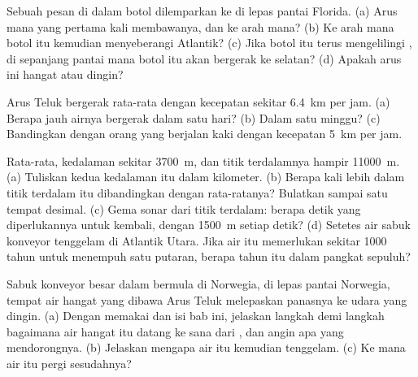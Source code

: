\begin{exercise}[$\star\star$]\label{exo:g8:the-oceans:9}
Sebuah pesan di dalam botol dilemparkan ke  di lepas pantai Florida.
(a) Arus mana yang pertama kali membawanya, dan ke arah mana? (b) Ke arah
mana botol itu kemudian menyeberangi Atlantik? (c) Jika botol itu terus
mengelilingi , di sepanjang pantai mana botol itu akan bergerak ke
selatan? (d) Apakah arus ini hangat atau dingin?
\end{exercise}

\begin{exercise}[$\star\star$]\label{exo:g8:the-oceans:10}
Arus Teluk bergerak rata-rata dengan kecepatan sekitar \qty{6.4}{km} per
jam. (a) Berapa jauh airnya bergerak dalam satu hari? (b) Dalam satu
minggu? (c) Bandingkan dengan orang yang berjalan kaki dengan kecepatan
\qty{5}{km} per jam.
\end{exercise}

\begin{exercise}[$\star\star\star$]\label{exo:g8:the-oceans:11}
Rata-rata, kedalaman  sekitar \qty{3700}{m}, dan titik terdalamnya
hampir \qty{11000}{m}. (a) Tuliskan kedua kedalaman itu dalam kilometer.
(b) Berapa kali lebih dalam titik terdalam itu dibandingkan dengan
rata-ratanya? Bulatkan sampai satu tempat desimal. (c) Gema sonar dari
titik terdalam: berapa detik yang diperlukannya untuk kembali, dengan
\qty{1500}{m} setiap detik? (d) Setetes air sabuk konveyor tenggelam di
Atlantik Utara. Jika air itu memerlukan sekitar \num{1000} tahun untuk
menempuh satu putaran, berapa tahun itu dalam pangkat sepuluh?
\end{exercise}

\begin{exercise}[$\star\star\star$]\label{exo:g8:the-oceans:12}
Sabuk konveyor besar  dalam bermula di  Norwegia, di lepas
pantai Norwegia, tempat air hangat yang dibawa Arus Teluk melepaskan
panasnya ke udara yang dingin. (a) Dengan memakai   dan
isi bab ini, jelaskan langkah demi langkah bagaimana air hangat itu
datang ke sana dari , dan angin apa yang mendorongnya.
(b) Jelaskan mengapa air itu kemudian tenggelam. (c) Ke mana air itu
pergi sesudahnya?
\end{exercise}

